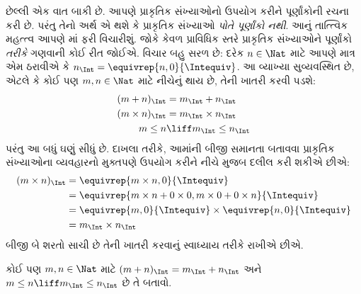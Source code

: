 \documentclass[../../../include/open-logic-section]{subfiles}
\begin{document}
છેલ્લી એક વાત બાકી છે. આપણે પ્રાકૃતિક સંખ્યાઓનો ઉપયોગ કરીને
પૂર્ણાંકોની રચના કરી છે. પરંતુ તેનો અર્થ એ થશે કે પ્રાકૃતિક સંખ્યાઓ
\emph{પોતે પૂર્ણાંકો નથી}. આનું તાત્ત્વિક મહત્ત્વ આપણે
માં ફરી વિચારીશું. જોકે કેવળ પ્રાવિધિક સ્તરે
પ્રાકૃતિક સંખ્યાઓને પૂર્ણાંકો \emph{તરીકે} ગણવાની કોઈ રીત જોઈએ.
વિચાર બહુ સરળ છે: દરેક $n \in \Nat$ માટે આપણે માત્ર એમ ઠરાવીએ કે
$n_\Int = \equivrep{n, 0}{\Intequiv}$. આ વ્યાખ્યા સુવ્યવસ્થિત છે,
એટલે કે કોઈ પણ $m, n \in \Nat$ માટે નીચેનું થાય છે, તેની ખાતરી કરવી પડશે:
\begin{align*}
  (m + n)_\Int &= m_\Int + n_\Int\\
  (m \times n)_\Int &= m_\Int \times n_\Int\\
  m \leq n &\liff m_\Int \leq n_\Int
\end{align*}
પરંતુ આ બધું ઘણું સીધું છે. દાખલા તરીકે, આમાંની બીજી સમાનતા
બતાવવા પ્રાકૃતિક સંખ્યાઓના વ્યવહારનો મુક્તપણે ઉપયોગ કરીને નીચે મુજબ
દલીલ કરી શકીએ છીએ:
  \begin{align*}
    (m \times n)_\Int  &= \equivrep{m \times n, 0}{\Intequiv} \\
    &= \equivrep{m \times n + 0 \times 0, m \times 0 + 0 \times n}{\Intequiv} \\
    &= \equivrep{m, 0}{\Intequiv} \times \equivrep{n, 0}{\Intequiv} \\
    &= m_\Int \times n_\Int
  \end{align*}
બીજી બે શરતો સાચી છે તેની ખાતરી કરવાનું સ્વાધ્યાય તરીકે રાખીએ છીએ.
\begin{prob}
  કોઈ પણ $m, n \in \Nat$ માટે $(m + n)_\Int = m_\Int + n_\Int$
  અને $m \leq n \liff m_\Int \leq n_\Int$ છે તે બતાવો.
\end{prob}
\end{document}
